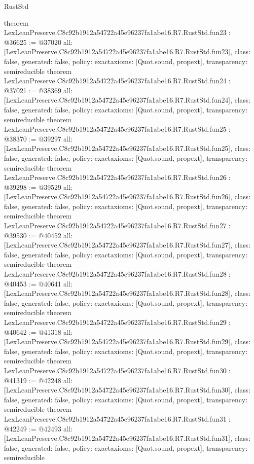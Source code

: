 \begin{lexlean}{RustStd}
\begin{coremodule}
{}
theorem LexLeanPreserve.C8c92b1912a54722a45e96237fa1abe16.R7.RustStd.fun23 : @36625 := @37020 {
  all: [LexLeanPreserve.C8c92b1912a54722a45e96237fa1abe16.R7.RustStd.fun23],
  class: false,
  generated: false,
  policy: exact{axioms: [Quot.sound, propext]},
  transparency: semireducible
}
theorem LexLeanPreserve.C8c92b1912a54722a45e96237fa1abe16.R7.RustStd.fun24 : @37021 := @38369 {
  all: [LexLeanPreserve.C8c92b1912a54722a45e96237fa1abe16.R7.RustStd.fun24],
  class: false,
  generated: false,
  policy: exact{axioms: [Quot.sound, propext]},
  transparency: semireducible
}
theorem LexLeanPreserve.C8c92b1912a54722a45e96237fa1abe16.R7.RustStd.fun25 : @38370 := @39297 {
  all: [LexLeanPreserve.C8c92b1912a54722a45e96237fa1abe16.R7.RustStd.fun25],
  class: false,
  generated: false,
  policy: exact{axioms: [Quot.sound, propext]},
  transparency: semireducible
}
theorem LexLeanPreserve.C8c92b1912a54722a45e96237fa1abe16.R7.RustStd.fun26 : @39298 := @39529 {
  all: [LexLeanPreserve.C8c92b1912a54722a45e96237fa1abe16.R7.RustStd.fun26],
  class: false,
  generated: false,
  policy: exact{axioms: [Quot.sound, propext]},
  transparency: semireducible
}
theorem LexLeanPreserve.C8c92b1912a54722a45e96237fa1abe16.R7.RustStd.fun27 : @39530 := @40452 {
  all: [LexLeanPreserve.C8c92b1912a54722a45e96237fa1abe16.R7.RustStd.fun27],
  class: false,
  generated: false,
  policy: exact{axioms: [Quot.sound, propext]},
  transparency: semireducible
}
theorem LexLeanPreserve.C8c92b1912a54722a45e96237fa1abe16.R7.RustStd.fun28 : @40453 := @40641 {
  all: [LexLeanPreserve.C8c92b1912a54722a45e96237fa1abe16.R7.RustStd.fun28],
  class: false,
  generated: false,
  policy: exact{axioms: [Quot.sound, propext]},
  transparency: semireducible
}
theorem LexLeanPreserve.C8c92b1912a54722a45e96237fa1abe16.R7.RustStd.fun29 : @40642 := @41318 {
  all: [LexLeanPreserve.C8c92b1912a54722a45e96237fa1abe16.R7.RustStd.fun29],
  class: false,
  generated: false,
  policy: exact{axioms: [Quot.sound, propext]},
  transparency: semireducible
}
theorem LexLeanPreserve.C8c92b1912a54722a45e96237fa1abe16.R7.RustStd.fun30 : @41319 := @42248 {
  all: [LexLeanPreserve.C8c92b1912a54722a45e96237fa1abe16.R7.RustStd.fun30],
  class: false,
  generated: false,
  policy: exact{axioms: [Quot.sound, propext]},
  transparency: semireducible
}
theorem LexLeanPreserve.C8c92b1912a54722a45e96237fa1abe16.R7.RustStd.fun31 : @42249 := @42493 {
  all: [LexLeanPreserve.C8c92b1912a54722a45e96237fa1abe16.R7.RustStd.fun31],
  class: false,
  generated: false,
  policy: exact{axioms: [Quot.sound, propext]},
  transparency: semireducible
}
\end{coremodule}
\end{lexlean}
